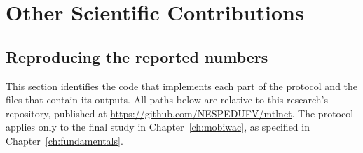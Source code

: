 
\chapter{Other Scientific Contributions}
\label{apx:contributions}

\section{Reproducing the reported numbers}
\label{apx:contributions:repro}

This section identifies the code that implements each part of the protocol and the files
that contain its outputs. All paths below are relative to this research's repository,
published at \url{https://github.com/NESPEDUFV/mtlnet}. The protocol
applies only to the final study in Chapter~\ref{ch:mobiwac}, as specified in
Chapter~\ref{ch:fundamentals}.


